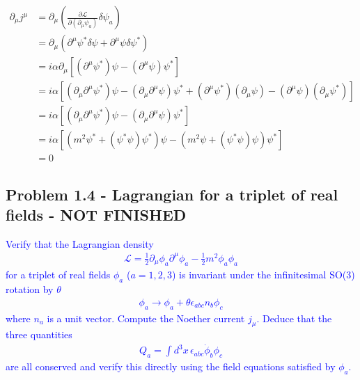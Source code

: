 \documentclass[../main.tex]{subfiles}
\begin{document}
\begin{align}
\partial_\mu j^\mu&=\partial_\mu\left(\frac{\partial\mathcal{L}}{\partial(\partial_\mu\psi_a)}\delta\psi_a\right)\\
&=\partial_\mu\left(\partial^\mu\psi^*\delta\psi+\partial^\mu\psi\delta\psi^*\right)\\
&=i\alpha\partial_\mu\left[(\partial^\mu\psi^*)\psi-(\partial^\mu\psi)\psi^*\right]\\
&=i\alpha\left[(\partial_\mu\partial^\mu\psi^*)\psi-(\partial_\mu\partial^\mu\psi)\psi^*+(\partial^\mu\psi^*)(\partial_\mu\psi)-(\partial^\mu\psi)(\partial_\mu\psi^*)\right]\\
&=i\alpha\left[(\partial_\mu\partial^\mu\psi^*)\psi-(\partial_\mu\partial^\mu\psi)\psi^*\right]\\
&=i\alpha\left[(m^2\psi^*+(\psi^*\psi)\psi^*)\psi-(m^2\psi+(\psi^*\psi)\psi)\psi^*\right]\\
&=0
\end{align}

\subsection{Problem 1.4 - Lagrangian for a triplet of real fields - NOT FINISHED}

\textcolor{blue}{
Verify that the Lagrangian density
\begin{align}
\mathcal{L}=\frac{1}{2}\partial_\mu\phi_a\partial^\mu\phi_a-\frac{1}{2}m^2\phi_a\phi_a
\end{align}
for a triplet of real fields $\phi_a$ ($a = 1,2,3$) is invariant under the infinitesimal SO(3) rotation by $\theta$
\begin{align}
\phi_a\rightarrow\phi_a+\theta\epsilon_{abc}n_b\phi_c
\end{align}
where $n_a$ is a unit vector. Compute the Noether current $j_\mu$. Deduce that the three quantities
\begin{align}
Q_a=\int d^3x\,\epsilon_{abc}\dot{\phi}_b\phi_c
\end{align}
are all conserved and verify this directly using the field equations satisfied by $\phi_a$.
}\newline
\end{document}
